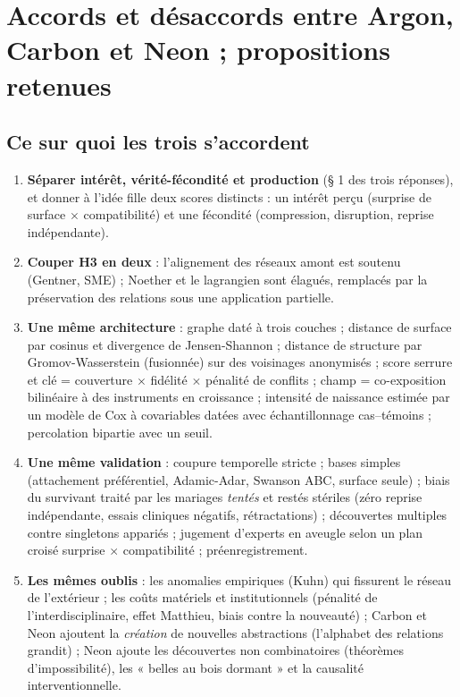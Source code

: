 \documentclass[a4paper,11pt]{article}
\begin{document}
\section{Accords et désaccords entre Argon, Carbon et Neon ; propositions retenues}

\subsection{Ce sur quoi les trois s'accordent}
\begin{enumerate}[itemsep=2pt]
\item \textbf{Séparer intérêt, vérité-fécondité et production} (§ 1 des trois réponses), et donner à l'idée fille deux scores distincts : un intérêt perçu (surprise de surface $\times$ compatibilité) et une fécondité (compression, disruption, reprise indépendante).
\item \textbf{Couper H3 en deux} : l'alignement des réseaux amont est soutenu (Gentner, SME) ; Noether et le lagrangien sont élagués, remplacés par la préservation des relations sous une application partielle.
\item \textbf{Une même architecture} : graphe daté à trois couches ; distance de surface par cosinus et divergence de Jensen-Shannon ; distance de structure par Gromov-Wasserstein (fusionnée) sur des voisinages anonymisés ; score serrure et clé = couverture $\times$ fidélité $\times$ pénalité de conflits ; champ = co-exposition bilinéaire à des instruments en croissance ; intensité de naissance estimée par un modèle de Cox à covariables datées avec échantillonnage cas–témoins ; percolation bipartie avec un seuil.
\item \textbf{Une même validation} : coupure temporelle stricte ; bases simples (attachement préférentiel, Adamic-Adar, Swanson ABC, surface seule) ; biais du survivant traité par les mariages \emph{tentés} et restés stériles (zéro reprise indépendante, essais cliniques négatifs, rétractations) ; découvertes multiples contre singletons appariés ; jugement d'experts en aveugle selon un plan croisé surprise $\times$ compatibilité ; préenregistrement.
\item \textbf{Les mêmes oublis} : les anomalies empiriques (Kuhn) qui fissurent le réseau de l'extérieur ; les coûts matériels et institutionnels (pénalité de l'interdisciplinaire, effet Matthieu, biais contre la nouveauté) ; Carbon et Neon ajoutent la \emph{création} de nouvelles abstractions (l'alphabet des relations grandit) ; Neon ajoute les découvertes non combinatoires (théorèmes d'impossibilité), les « belles au bois dormant » et la causalité interventionnelle.
\end{enumerate}
\end{document}
